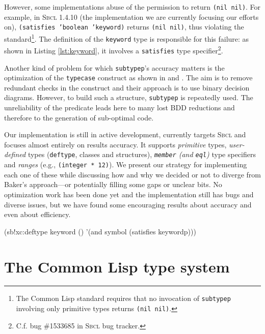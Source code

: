 \documentclass[format=sigconf]{acmart}
\newcommand\code[2][\small]{\sloppy\texttt{#1#2}}
\newcommand\footcode[1]{\code[\scriptsize]{#1}}
\theoremstyle{definition}
\newcommand\sbcl{\textsc{Sbcl}}
\begin{document}
However, some implementations abuse of the permission to return \code{(nil nil)}.
For example, in \sbcl{} 1.4.10 (the implementation we are currently focusing our
efforts on), {\small\code{(satisfies 'boolean 'keyword)}} returns
\code{(nil nil)}, thus violating the standard\footnote{The Common Lisp standard
  requires that no invocation of \footcode{subtypep} involving only primitive types
  returns \footcode{(nil nil)}.}. The definition of the \code{keyword} type is
responsible for this failure: as shown in Listing \ref{lst:keyword}, it
involves a \code{satisfies} type specifier\footnote{%
  C.f. bug \#1533685 in \sbcl{} bug tracker.
}.

Another kind of problem for which \code{subtypep}'s accuracy matters is the
optimization of the \code{typecase} construct as shown in \cite{newton.18.phd}
and \cite{newton.18.els}. The aim is to remove redundant checks in the construct
and their approach is to use binary decision diagrams. However, to build such a
structure, \code{subtypep} is repeatedly used. The unreliability of the
predicate leads here to many lost BDD reductions and therefore to the
generation of sub-optimal code.

Our implementation is still in active development, currently targets
\sbcl{} and focuses almost entirely on results accuracy. It supports
\emph{primitive} types, \emph{user-defined} types (\code{deftype}, classes and structures),
\emph{\code{member} (and \code{eql})} type specifiers and \emph{ranges} (e.g.,
\code{(integer * 12)}). We present our strategy for implementing each one
of these while discussing how and why we decided or not to diverge from Baker's
\cite{baker1992}
approach---or potentially filling some gaps or unclear bits.
No optimization work has been done yet and the implementation still has
bugs and diverse issues, but we have found some encouraging results about
accuracy and even about efficiency.

\begin{listing}
  \begin{clcode}
(sb!xc:deftype keyword ()
  '(and symbol (satisfies keywordp)))
  \end{clcode}
  \caption{The \code{keyword} type definition in \sbcl}
  \label{lst:keyword}
\end{listing}


\section{The Common Lisp type system}
\end{document}
